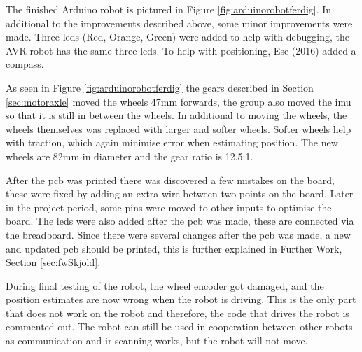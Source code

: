 The finished Arduino robot is pictured in Figure \ref{fig:arduinorobotferdig}. In additional to the improvements described above, some minor improvements were made. Three \acrshort{led}s (Red, Orange, Green) were added to help with debugging, the AVR robot has the same three \acrshort{led}s. To help with positioning, Ese (2016) added a compass.

As seen in Figure \ref{fig:arduinorobotferdig} the gears described in Section \ref{sec:motoraxle} moved the wheels 47mm forwards, the group also moved the \acrshort{imu} so that it is still in between the wheels. In additional to moving the wheels, the wheels themselves was replaced with larger and softer wheels. Softer wheels help with traction, which again minimise error when estimating position. The new wheels are 82mm in diameter and the gear ratio is 12.5:1.

After the \acrshort{pcb} was printed there was discovered a few mistakes on the board, these were fixed by adding an extra wire between two points on the board. Later in the project period, some pins were moved to other inputs to optimise the board. The \acrshort{led}s were also added after the \acrshort{pcb} was made, these are connected via the breadboard. Since there were several changes after the \acrshort{pcb} was made, a new and updated \acrshort{pcb} should be printed, this is further explained in Further Work, Section \ref{sec:fwSkjold}.

During final testing of the robot, the wheel encoder got damaged, and the position estimates are now wrong when the robot is driving. This is the only part that does not work on the robot and therefore, the code that drives the robot is commented out. The robot can still be used in cooperation between other robots as communication and \acrshort{ir} scanning works, but the robot will not move.